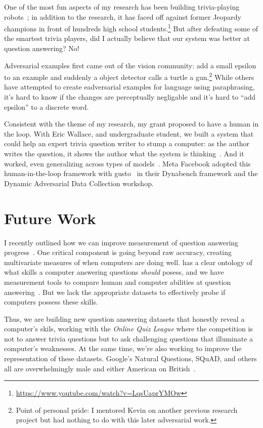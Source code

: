 One of the most fun aspects of my research has been building
trivia-playing robots~\cite{boyd-graber-12,iyyer-14b,iyyer-15}; in
addition to the research, it has faced off against
former Jeopardy champions in front of hundreds high school
students.\footnote{\url{https://www.youtube.com/watch?v=LqsUaprYMOw}}
%
But after defeating some of the smartest trivia players, did I
actually believe that our system was better at question answering?
%
No!

Adversarial examples first came out of the vision community: add a
small epsilon to an example and suddenly a object detector calls a
turtle a gun.\footnote{Point of personal pride: I mentored Kevin on
another previous research project but had nothing to do with this later
adversarial work.}
%
While others have attempted to create eadversarial examples for
language using paraphrasing, it's hard to know if the changes are
perceptually negligable and it's hard to ``add epsilon'' to a discrete
word.

Consistent with the theme of my research, my  grant
proposed to have a human in the loop.
%
With Eric Wallace, and undergraduate student, we built a system that
could help an expert trivia question writer to stump a computer: as
the author writes the question, it shows the author what the system is
thinking~\cite{wallace-18}.
%
And it worked, even generalizing across types of
models~\cite{wallace-19}.
%
Meta Facebook adopted this human-in-the-loop framework with
gusto~\cite{bartolo-20} in their Dynabench framework and the Dynamic
Adversarial Data Collection workshop.

\section{Future Work}

I recently outlined how we can improve measurement of question
answering progress~\cite{boyd-graber-20}.
%
One critical component is going beyond raw accuracy, creating multivariate measures of when computers are doing well.
%
 has a clear ontology of what skills a computer answering questions \emph{should} posess, and we have measurement tools to compare human and computer abilities at question answering~\cite{rodriguez-21}.
%
But we lack the appropriate datasets to effectively probe if computers possess these skills.  

Thus, we are building new question answering datasets that honestly reveal a computer's skils, working with the \textit{Online Quiz League} where the competition is not to answer trivia questions but to ask challenging questions that illuminate a computer's weaknesses.
%
At the same time, we're also working to improve the representation of these datasets.
%
Google's Natural Questions, SQuAD, and others all are overwhelmingly male and either American on British~\cite{gor-21}.

